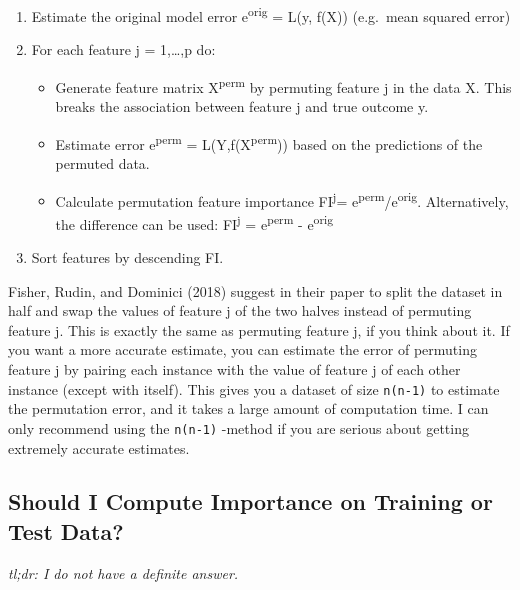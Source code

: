 \documentclass[
  12pt,
]{krantz}
\providecommand{\tightlist}{%
  \setlength{\itemsep}{0pt}\setlength{\parskip}{0pt}}
\begin{document}
\begin{enumerate}
\def\labelenumi{\arabic{enumi}.}
\tightlist
\item
  Estimate the original model error e\textsuperscript{orig} = L(y, f(X)) (e.g.~mean squared error)
\item
  For each feature j = 1,\ldots,p do:

  \begin{itemize}
  \tightlist
  \item
    Generate feature matrix X\textsuperscript{perm} by permuting feature j in the data X. This breaks the association between feature j and true outcome y.
  \item
    Estimate error e\textsuperscript{perm} = L(Y,f(X\textsuperscript{perm})) based on the predictions of the permuted data.
  \item
    Calculate permutation feature importance FI\textsuperscript{j}= e\textsuperscript{perm}/e\textsuperscript{orig}. Alternatively, the difference can be used: FI\textsuperscript{j} = e\textsuperscript{perm} - e\textsuperscript{orig}
  \end{itemize}
\item
  Sort features by descending FI.
\end{enumerate}

Fisher, Rudin, and Dominici (2018) suggest in their paper to split the dataset in half and swap the values of feature j of the two halves instead of permuting feature j.
This is exactly the same as permuting feature j, if you think about it.
If you want a more accurate estimate, you can estimate the error of permuting feature j by pairing each instance with the value of feature j of each other instance (except with itself).
This gives you a dataset of size \texttt{n(n-1)} to estimate the permutation error, and it takes a large amount of computation time.
I can only recommend using the \texttt{n(n-1)} -method if you are serious about getting extremely accurate estimates.

\hypertarget{feature-importance-data}{%
\subsection{Should I Compute Importance on Training or Test Data?}\label{feature-importance-data}}

\emph{tl;dr: I do not have a definite answer.}
\end{document}
